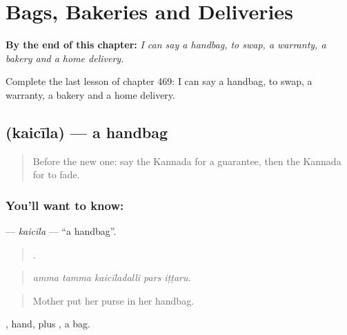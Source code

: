 
\chapter{Bags, Bakeries and Deliveries}
\label{ch:ka-bags-bakeries-and-deliveries}

\begin{chapteropening}
\textbf{By the end of this chapter:} \emph{I can say a handbag, to swap, a warranty, a bakery and a home delivery.}

Complete the last lesson of chapter 469: I can say a handbag, to swap, a warranty, a bakery and a home delivery.
\end{chapteropening}

\section[\texorpdfstring{\kn{ಕೈಚೀಲ} (kaicīla)}{ಕೈಚೀಲ (kaicīla)}]{ (kaicīla) — a handbag}

\label{lesson:KA-C469-kaicila}



\begin{quote}
Before the new one: say the Kannada for a guarantee, then the Kannada for to fade.
\end{quote}

\subsection*{You'll want to know: }
\textbf{} — \emph{kaicīla} — \textquotedblleft{}a handbag\textquotedblright{}.

\begin{quote}
    .
\end{quote}

\begin{quote}
\emph{amma tamma kaicīladalli pars iṭṭaru.}
\end{quote}

\begin{quote}
Mother put her purse in her handbag.
\end{quote}

, hand, plus , a bag.


